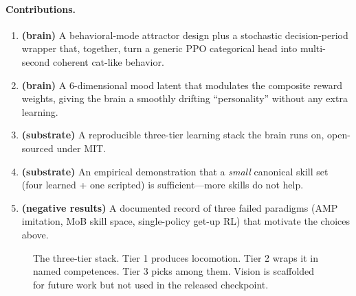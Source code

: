 \documentclass[11pt]{article}
\begin{document}
\paragraph{Contributions.}
\begin{enumerate}[leftmargin=*,nosep]
  \item \textbf{(brain)} A behavioral-mode attractor design plus a
        stochastic decision-period wrapper that, together, turn a generic
        PPO categorical head into multi-second coherent cat-like behavior.
  \item \textbf{(brain)} A 6-dimensional mood latent that modulates the
        composite reward weights, giving the brain a smoothly drifting
        ``personality'' without any extra learning.
  \item \textbf{(substrate)} A reproducible three-tier learning stack
        the brain runs on, open-sourced under MIT.
  \item \textbf{(substrate)} An empirical demonstration that a
        \emph{small} canonical skill set (four learned + one scripted) is
        sufficient---more skills do not help.
  \item \textbf{(negative results)} A documented record of three failed
        paradigms (AMP imitation, MoB skill space, single-policy get-up
        RL) that motivate the choices above.
\end{enumerate}

\begin{figure}[t]
  \centering
  \caption{The three-tier stack. Tier 1 produces locomotion. Tier 2 wraps it
  in named competences. Tier 3 picks among them. Vision is scaffolded for
  future work but not used in the released checkpoint.}
  \label{fig:stack}
\end{figure}
\end{document}

